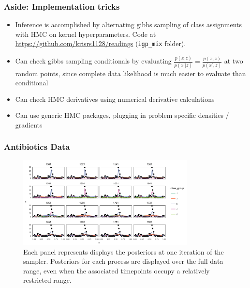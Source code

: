 \documentclass{beamer}
\begin{document}
\begin{frame}
  \frametitle{Aside: Implementation tricks}
  \begin{itemize}
  \item Inference is accomplished by alternating gibbs sampling of class
    assignments with HMC on kernel hyperparameters. Code at
    \url{https://github.com/krisrs1128/readings} (\texttt{igp\_mix} folder).
  \item Can check gibbs sampling conditionals by evaluating $\frac{p\left(x
    \vert z\right)}{p\left(x^{\prime} \vert z\right)} = \frac{p\left(x,
      z\right)}{p\left(x^{\prime}, z\right)}$ at two random points, since
    complete data likelihood is much easier to evaluate than conditional
    \citep{grosse2014testing}
  \item Can check HMC derivatives using numerical derivative calculations
  \item Can use generic HMC packages, plugging in problem specific densities /
    gradients
  \end{itemize}
\end{frame}

\begin{frame}
  \frametitle{Antibiotics Data}
\begin{figure}[ht]
  \centering
  \includegraphics[width=0.8\textwidth]{figure/abt_fits}
  \caption{Each panel represents displays the posteriors at one
    iteration of the sampler. Posteriors for each process are displayed over the
    full data range, even when the associated timepoints occupy a relatively
    restricted range. \label{fig:abt_fits}}
\end{figure}
\end{frame}
\end{document}
